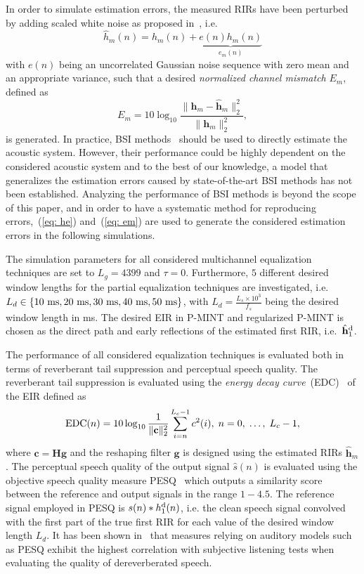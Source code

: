 \documentclass[10pt]{IEEEtran}
\begin{document}
In order to simulate estimation errors, the measured RIRs have been perturbed by adding scaled white noise as proposed in~\cite{Cho_ITSA_1999}, i.e.
\begin{equation}
  \label{eq: he}
  \hat{h}_m(n) = h_m(n) + \underbrace{e(n)h_m(n)}_{e_m(n)}
\end{equation}
with $e(n)$ being an uncorrelated Gaussian noise sequence with zero mean and an appropriate variance, such that a desired \emph{normalized channel mismatch} $E_m$, defined as
\begin{equation}
  \label{eq: em}
E_m = 10 \log_{10} \frac{\|\mathbf{h}_m - \hat{\mathbf{h}}_m \|_2^2}{\|\mathbf{h}_m\|_2^2},
\end{equation}
is generated.
In practice, BSI methods~\cite{Haque_ITASLP_2011} should be used to directly estimate the acoustic system. 
However, their performance could be highly dependent on the considered acoustic system and to the best of our knowledge, a model that generalizes the estimation errors caused by state-of-the-art BSI methods has not been established. 
Analyzing the performance of BSI methods is beyond the scope of this paper, and in order to have a systematic method for reproducing errors,~(\ref{eq: he}) and~(\ref{eq: em}) are used to generate the considered estimation errors in the following simulations.

The simulation parameters for all considered multichannel equalization techniques are set to  $L_g = 4399$ and $\tau = 0$.
Furthermore, $5$ different desired window lengths for the partial equalization techniques are investigated, i.e. $L_d \in \{ 10~{\rm ms}, 20~{\rm ms}, 30~{\rm ms}, 40~{\rm ms}, 50~{\rm ms} \}$, with $L_d = \frac{L_s \times 10^3}{f_s}$ being the desired window length in ms.
The desired EIR in P-MINT and regularized P-MINT is chosen as the direct path and early reflections of the estimated first RIR, i.e.~$\hat{\mathbf{h}}_1^{\rm d}$.

The performance of all considered equalization techniques is evaluated both in terms of reverberant tail suppression and perceptual speech quality.
The reverberant tail suppression is evaluated using the \emph{energy decay curve}~(EDC)~\cite{Naylor_Derev_book} of the EIR defined as
\begin{equation}
{\rm EDC}(n) = 10 \log_{10} \frac{1}{\|\mathbf{c}\|_2^2} \sum_{i = n}^{L_c-1} c^2(i), \; n =0, \; \ldots, \; L_c-1,
\end{equation}
where $\mathbf{c} = \mathbf{H}\mathbf{g}$ and the reshaping filter $\mathbf{g}$ is designed using the estimated RIRs $\hat{\mathbf{h}}_m$.
The perceptual speech quality of the output signal $\hat{s}(n)$ is evaluated using the objective speech quality measure PESQ~\cite{PESQ} which outputs a similarity score between the reference and output signals in the range $1-4.5$.
The reference signal employed in PESQ is $s(n) \ast h_1^{\rm d}(n)$, i.e. the clean speech signal convolved with the first part of the true first RIR for each value of the desired window length $L_d$.
It has been shown in~\cite{Goetze_AES_2010} that measures relying on auditory models such as PESQ exhibit the highest correlation with subjective listening tests when evaluating the quality of dereverberated speech.
\end{document}
